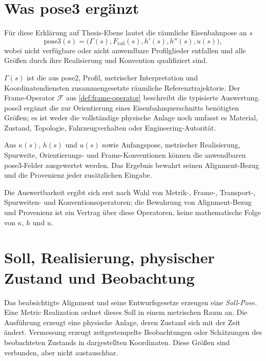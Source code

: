 \section{Was pose3 ergänzt}

\begin{definition}
\label{def:runtime-pose3}
Für diese Erklärung auf Thesis-Ebene lautet die räumliche Eisenbahnpose an
\(s\)
\begin{equation}
\mathrm{pose3}(s)=
\bigl(\Gamma(s),F_{\mathrm{rail}}(s),
h'(s),h''(s),u(s)\bigr),
\label{eq:runtime-pose3}
\end{equation}
wobei nicht verfügbare oder nicht anwendbare Profilglieder entfallen und alle
Größen durch ihre Realisierung und Konvention qualifiziert sind.
\end{definition}

\(\Gamma(s)\) ist die aus pose2, Profil, metrischer Interpretation und
Koordinatendiensten zusammengesetzte räumliche Referenztrajektorie. Der
Frame-Operator \(\mathcal F\) aus \cref{def:frame-operator} beschreibt die
typisierte Auswertung. pose3 ergänzt die zur Orientierung eines
Eisenbahnquerschnitts benötigten Größen; es ist weder die vollständige
physische Anlage noch umfasst es Material, Zustand, Topologie,
Fahrzeugverhalten oder Engineering-Autorität.

\begin{principle}
\label{prop:pose3-reconstruction}
Aus \(\kappa(s)\), \(h(s)\) und \(u(s)\) sowie Anfangspose, metrischer
Realisierung, Spurweite, Orientierungs- und Frame-Konventionen können die
anwendbaren pose3-Felder ausgewertet werden. Das Ergebnis bewahrt seinen
Alignment-Bezug und die Provenienz jeder zusätzlichen Eingabe.
\end{principle}

Die Auswertbarkeit ergibt sich erst nach Wahl von Metrik-, Frame-,
Transport-, Spurweiten- und Konventionsoperatoren; die Bewahrung von
Alignment-Bezug und Provenienz ist ein Vertrag über diese Operatoren, keine
mathematische Folge von \(\kappa\), \(h\) und \(u\).

\section{Soll, Realisierung, physischer Zustand und Beobachtung}

Das beabsichtigte Alignment und seine Entwurfsgesetze erzeugen eine
\emph{Soll-Pose}. Eine Metric Realization ordnet dieses Soll in einem
metrischen Raum an. Die Ausführung erzeugt eine physische Anlage, deren Zustand
sich mit der Zeit ändert. Vermessung erzeugt zeitgestempelte Beobachtungen oder
Schätzungen des beobachteten Zustands in dargestellten Koordinaten. Diese
Größen sind verbunden, aber nicht austauschbar.


